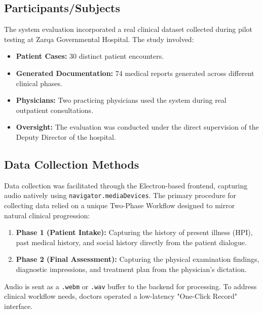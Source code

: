 \documentclass[12pt,a4paper]{article}
\begin{document}
\subsection{Participants/Subjects}
The system evaluation incorporated a real clinical dataset collected during pilot testing at Zarqa Governmental Hospital. The study involved:
\begin{itemize}
    \item \textbf{Patient Cases:} 30 distinct patient encounters.
    \item \textbf{Generated Documentation:} 74 medical reports generated across different clinical phases.
    \item \textbf{Physicians:} Two practicing physicians used the system during real outpatient consultations.
    \item \textbf{Oversight:} The evaluation was conducted under the direct supervision of the Deputy Director of the hospital.
\end{itemize}

\subsection{Data Collection Methods}
Data collection was facilitated through the Electron-based frontend, capturing audio natively using \texttt{navigator.mediaDevices}. 
The primary procedure for collecting data relied on a unique Two-Phase Workflow designed to mirror natural clinical progression:
\begin{enumerate}
    \item \textbf{Phase 1 (Patient Intake):} Capturing the history of present illness (HPI), past medical history, and social history directly from the patient dialogue.
    \item \textbf{Phase 2 (Final Assessment):} Capturing the physical examination findings, diagnostic impressions, and treatment plan from the physician's dictation.
\end{enumerate}
Audio is sent as a \texttt{.webm} or \texttt{.wav} buffer to the backend for processing. To address clinical workflow needs, doctors operated a low-latency "One-Click Record" interface.
\end{document}
